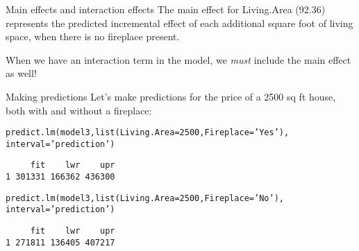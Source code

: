 \documentclass{beamer}\usepackage[]{graphicx}\usepackage[]{color}
\makeatletter
\newcommand{\hlnum}[1]{\textcolor[rgb]{0.824,0.412,0.118}{#1}}%
\newcommand{\hlstr}[1]{\textcolor[rgb]{1,0.894,0.71}{#1}}%
\newcommand{\hlstd}[1]{\textcolor[rgb]{1,0.894,0.769}{#1}}%
\newcommand{\hlkwc}[1]{\textcolor[rgb]{0.78,0.941,0.545}{#1}}%
\newcommand{\hlkwd}[1]{\textcolor[rgb]{1,0.78,0.769}{#1}}%
\newenvironment{kframe}{%
 \def\at@end@of@kframe{}%
 \ifinner\ifhmode%
  \def\at@end@of@kframe{\end{minipage}}%
  \begin{minipage}{\columnwidth}%
 \fi\fi%
 \def\FrameCommand##1{\hskip\@totalleftmargin \hskip-\fboxsep
 \colorbox{shadecolor}{##1}\hskip-\fboxsep
     \hskip-\linewidth \hskip-\@totalleftmargin \hskip\columnwidth}%
 \MakeFramed {\advance\hsize-\width
   \@totalleftmargin\z@ \linewidth\hsize
   \@setminipage}}%
 {\par\unskip\endMakeFramed%
 \at@end@of@kframe}
\newenvironment{knitrout}{}{} %
\makeatother
\begin{document}
\begin{darkframes}
\begin{frame}[fragile]{Main effects and interaction effects}
      \pause
      The main effect for Living.Area (92.36) represents the predicted incremental effect of each additional square foot of living space, when there is no fireplace present.

      \bigskip\pause
      When we have an interaction term in the model, we \emph{must} include the main effect as well!
    \end{frame}

    \begin{frame}[fragile]{Making predictions}
      Let's make predictions for the price of a 2500 sq ft house, both with and without a fireplace:
\begin{knitrout}
\begin{kframe}
\begin{alltt}
\hlkwd{predict.lm}\hlstd{(model3,} \hlkwd{list}\hlstd{(}\hlkwc{Living.Area}\hlstd{=}\hlnum{2500}\hlstd{,} \hlkwc{Fireplace}\hlstd{=}\hlstr{'Yes'}\hlstd{),}
  \hlkwc{interval}\hlstd{=}\hlstr{'prediction'}\hlstd{)}
\end{alltt}
\begin{verbatim}
     fit    lwr    upr
1 301331 166362 436300
\end{verbatim}
\begin{alltt}
\hlkwd{predict.lm}\hlstd{(model3,} \hlkwd{list}\hlstd{(}\hlkwc{Living.Area}\hlstd{=}\hlnum{2500}\hlstd{,} \hlkwc{Fireplace}\hlstd{=}\hlstr{'No'}\hlstd{),}
  \hlkwc{interval}\hlstd{=}\hlstr{'prediction'}\hlstd{)}
\end{alltt}
\begin{verbatim}
     fit    lwr    upr
1 271811 136405 407217
\end{verbatim}
\end{kframe}
\end{knitrout}
    \end{frame}
  \end{darkframes}
\end{document}
